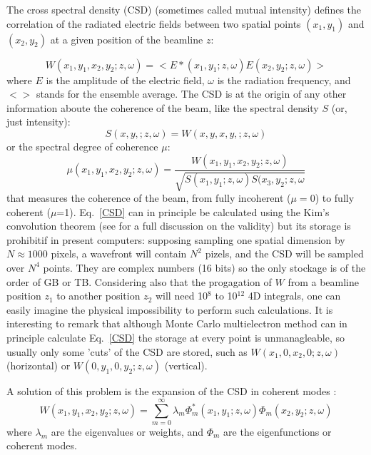 \documentclass{iucr}              %
\begin{document}
The cross spectral density (CSD) (sometimes called mutual intensity) defines the correlation of the radiated electric fields between two spatial points $(x_1,y_1)$ and $(x_2,y_2)$ at a given position of the beamline $z$:

\begin{equation}
W(x_1,y_1,x_2,y_2;z,\omega) = <E*(x_1,y_1; z,\omega) E(x_2,y_2;z,\omega)>
\label{CSD}
\end{equation}
where $E$ is the amplitude of the electric field, $\omega$ is the radiation frequency, and $<>$ stands for the ensemble average. The CSD is at the origin of any other information aboute the coherence of the beam, like the spectral density $S$ (or, just intensity): 
\begin{equation}
S(x,y,;z,\omega) = W(x,y,x,y,;z,\omega)
\end{equation}
or the spectral degree of coherence $\mu$:
\begin{equation}
\mu(x_1,y_1,x_2,y_2;z,\omega) = \frac{W(x_1,y_1,x_2,y_2;z,\omega)}{\sqrt{ S(x_1,y_1;z,\omega) S(x_3,y_2;z,\omega}}
\end{equation}
that measures the coherence of the beam, from fully incoherent ($\mu=0$) to fully coherent ($\mu$=1). 
Eq.~\ref{CSD} can in principle be calculated using the Kim's convolution theorem \cite{kim1986} (see \cite{geloni2008} for a full discussion on the validity) but its storage is prohibitif in present computers: supposing sampling one spatial dimension by $N\approx1000$ pixels, a wavefront will contain $N^2$ pizels, and the CSD will be sampled over $N^4$ points. They are complex numbers (16 bits) so the only stockage is of the order of GB or TB. Considering also that the progagation of $W$ from a beamline position $z_1$ to another position $z_2$ will need 10$^8$ to 10$^{12}$ 4D integrals, one can easily imagine the physical impossibility to perform such calculations. It is interesting to remark that although Monte Carlo multielectron method can in principle calculate Eq.~\ref{CSD} the storage at every point is unmanagleable, so usually only some 'cuts' of the CSD are stored, such as $W(x_1,0,x_2,0;z,\omega)$ (horizontal) or $W(0,y_1,0,y_2;z,\omega)$ (vertical).

A solution of this problem is the expansion of the CSD in coherent modes \cite{mandel_wolf}:  
\begin{equation}
 W(x_1,y_1,x_2,y_2;z,\omega) = \sum\limits_{m=0}^{\infty} \lambda_m \Phi_m^{*}(x_1,y_1;z,\omega) \Phi_m(x_2,y_2;z,\omega)
\label{decomposition}
 \end{equation}
where $\lambda_m$ are the eigenvalues or weights, and $\Phi_m$ are the eigenfunctions or coherent modes. 
\end{document}
